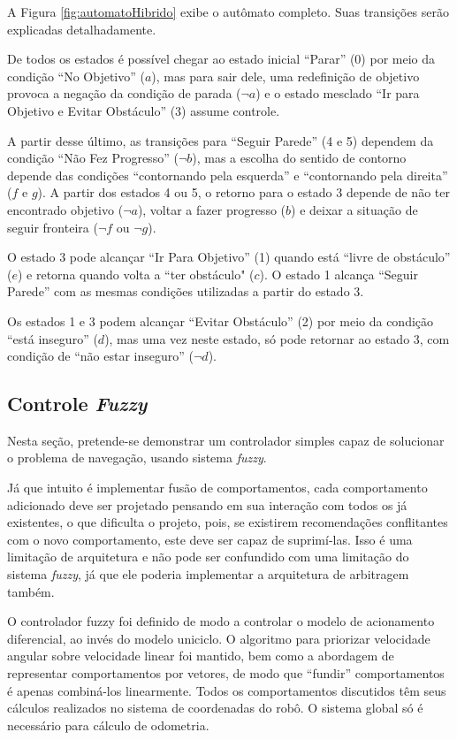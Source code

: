 		A Figura \ref{fig:automatoHibrido} exibe o autômato completo. Suas transições serão 
		explicadas detalhadamente. 
		
		
		
		De todos os estados é possível chegar ao estado inicial ``Parar'' (0) por meio da 
		condição ``No Objetivo'' ($a$), mas para sair dele, uma redefinição de objetivo provoca
		a negação da condição de parada ($\neg a$) e o estado mesclado ``Ir para Objetivo e 
		Evitar Obstáculo'' (3) assume controle.
		
		A partir desse último, as transições para ``Seguir Parede'' (4 e 5) dependem da condição 
		``Não Fez Progresso'' ($\neg b$), mas a escolha do sentido de contorno depende das
		condições ``contornando pela esquerda'' e ``contornando pela direita'' ($f$ e $g$). A partir
		dos estados 4 ou 5, o retorno para o estado 3 depende de não ter encontrado objetivo 
		($\neg a$), voltar a fazer progresso ($b$) e deixar a situação de seguir fronteira 
		($\neg f$ ou $\neg g$).
		
		O estado 3 pode alcançar ``Ir Para Objetivo'' (1) quando está ``livre de obstáculo'' ($e$)
		e retorna quando volta a ``ter obstáculo" ($c$). O estado 1 alcança ``Seguir Parede'' com
		as mesmas condições utilizadas a partir do estado 3.
		
		Os estados 1 e 3 podem alcançar ``Evitar Obstáculo'' (2) por meio da condição ``está
		inseguro'' ($d$), mas uma vez neste estado, só pode retornar ao estado 3, com condição de
		``não estar inseguro'' ($\neg d$).
		
	\subsection{Controle \textit{Fuzzy}}
	
	Nesta seção, pretende-se demonstrar um controlador simples capaz de solucionar 
	o problema de navegação, usando sistema \textit{fuzzy}. 

	Já que intuito é implementar fusão de comportamentos, cada comportamento adicionado deve 
	ser projetado pensando em sua interação com todos os já existentes, o que dificulta o projeto,
	pois, se existirem recomendações conflitantes com o novo comportamento, este deve ser capaz 
	de suprimí-las. Isso é uma limitação de arquitetura e não pode ser confundido com uma 
	limitação do sistema \textit{fuzzy}, já que ele poderia implementar a arquitetura de 
	arbitragem também. 
	
	O controlador fuzzy foi definido de modo a controlar o modelo de acionamento diferencial,
	ao invés do modelo uniciclo. O algoritmo para priorizar velocidade angular sobre 
	velocidade linear foi mantido, bem como a abordagem de representar comportamentos por 
	vetores, de modo que ``fundir'' comportamentos é apenas combiná-los linearmente. Todos
	os comportamentos discutidos têm seus cálculos realizados no sistema de coordenadas do robô.
	O sistema global só é necessário para cálculo de odometria.
	
